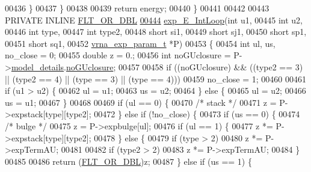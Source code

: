 \begin{DoxyCode}
00436     \}
00437   \}
00438 
00439   \textcolor{keywordflow}{return} energy;
00440 \}
00441 
00442 
00443 PRIVATE INLINE \hyperlink{group__data__structures_ga31125aeace516926bf7f251f759b6126}{FLT\_OR\_DBL}
\hyperlink{group__loops_ga95de54d8a2a17645a95e0f34e189d9c9}{00444} \hyperlink{group__loops_ga95de54d8a2a17645a95e0f34e189d9c9}{exp\_E\_IntLoop}(\textcolor{keywordtype}{int}               u1,
00445               \textcolor{keywordtype}{int}               u2,
00446               \textcolor{keywordtype}{int}               type,
00447               \textcolor{keywordtype}{int}               type2,
00448               \textcolor{keywordtype}{short}             si1,
00449               \textcolor{keywordtype}{short}             sj1,
00450               \textcolor{keywordtype}{short}             sp1,
00451               \textcolor{keywordtype}{short}             sq1,
00452               \hyperlink{group__energy__parameters_structvrna__exp__param__s}{vrna\_exp\_param\_t}  *P)
00453 \{
00454   \textcolor{keywordtype}{int}     ul, us, no\_close = 0;
00455   \textcolor{keywordtype}{double}  z           = 0.;
00456   \textcolor{keywordtype}{int}     noGUclosure = P->\hyperlink{group__energy__parameters_ac18055127bccc27c1223f1d2f3b01b53}{model\_details}.\hyperlink{group__model__details_a7e883db1f33f8f3baa5c9b140350c78e}{noGUclosure};
00457 
00458   \textcolor{keywordflow}{if} ((noGUclosure) && ((type2 == 3) || (type2 == 4) || (type == 3) || (type == 4)))
00459     no\_close = 1;
00460 
00461   \textcolor{keywordflow}{if} (u1 > u2) \{
00462     ul  = u1;
00463     us  = u2;
00464   \} \textcolor{keywordflow}{else} \{
00465     ul  = u2;
00466     us  = u1;
00467   \}
00468 
00469   \textcolor{keywordflow}{if} (ul == 0) \{
00470     \textcolor{comment}{/* stack */}
00471     z = P->expstack[type][type2];
00472   \} \textcolor{keywordflow}{else} \textcolor{keywordflow}{if} (!no\_close) \{
00473     \textcolor{keywordflow}{if} (us == 0) \{
00474       \textcolor{comment}{/* bulge */}
00475       z = P->expbulge[ul];
00476       \textcolor{keywordflow}{if} (ul == 1) \{
00477         z *= P->expstack[type][type2];
00478       \} \textcolor{keywordflow}{else} \{
00479         \textcolor{keywordflow}{if} (type > 2)
00480           z *= P->expTermAU;
00481 
00482         \textcolor{keywordflow}{if} (type2 > 2)
00483           z *= P->expTermAU;
00484       \}
00485 
00486       \textcolor{keywordflow}{return} (\hyperlink{group__data__structures_ga31125aeace516926bf7f251f759b6126}{FLT\_OR\_DBL})z;
00487     \} \textcolor{keywordflow}{else} \textcolor{keywordflow}{if} (us == 1) \{

\end{DoxyCode}
